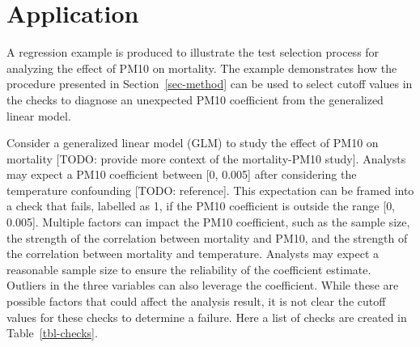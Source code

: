 \documentclass[
  12pt,
]{interact}
\begin{document}
\section{Application}\label{sec-pm10-mortality}

A regression example is produced to illustrate the test selection
process for analyzing the effect of PM10 on mortality. The example
demonstrates how the procedure presented in Section~\ref{sec-method} can
be used to select cutoff values in the checks to diagnose an unexpected
PM10 coefficient from the generalized linear model.

Consider a generalized linear model (GLM) to study the effect of PM10 on
mortality {[}TODO: provide more context of the mortality-PM10 study{]}.
Analysts may expect a PM10 coefficient between {[}0, 0.005{]} after
considering the temperature confounding {[}TODO: reference{]}. This
expectation can be framed into a check that fails, labelled as 1, if the
PM10 coefficient is outside the range {[}0, 0.005{]}. Multiple factors
can impact the PM10 coefficient, such as the sample size, the strength
of the correlation between mortality and PM10, and the strength of the
correlation between mortality and temperature. Analysts may expect a
reasonable sample size to ensure the reliability of the coefficient
estimate. Outliers in the three variables can also leverage the
coefficient. While these are possible factors that could affect the
analysis result, it is not clear the cutoff values for these checks to
determine a failure. Here a list of checks are created in
Table~\ref{tbl-checks}.
\end{document}
